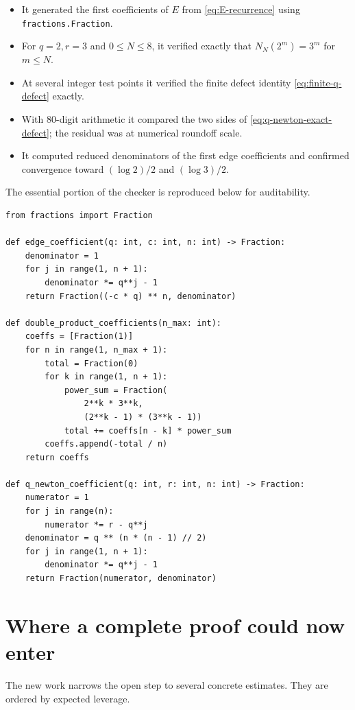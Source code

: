 \documentclass[11pt]{article}
\theoremstyle{definition}
\begin{document}
\begin{itemize}
\item It generated the first coefficients of \(E\) from \eqref{eq:E-recurrence} using \texttt{fractions.Fraction}.
\item For \(q=2,r=3\) and \(0\le N\le8\), it verified exactly that \(N_N(2^m)=3^m\) for \(m\le N\).
\item At several integer test points it verified the finite defect identity \eqref{eq:finite-q-defect} exactly.
\item With 80-digit arithmetic it compared the two sides of \eqref{eq:q-newton-exact-defect}; the residual was at numerical roundoff scale.
\item It computed reduced denominators of the first edge coefficients and confirmed convergence toward \((\log2)/2\) and \((\log3)/2\).
\end{itemize}

The essential portion of the checker is reproduced below for auditability.

\begin{lstlisting}[style=pycode]
from fractions import Fraction

def edge_coefficient(q: int, c: int, n: int) -> Fraction:
    denominator = 1
    for j in range(1, n + 1):
        denominator *= q**j - 1
    return Fraction((-c * q) ** n, denominator)

def double_product_coefficients(n_max: int):
    coeffs = [Fraction(1)]
    for n in range(1, n_max + 1):
        total = Fraction(0)
        for k in range(1, n + 1):
            power_sum = Fraction(
                2**k * 3**k,
                (2**k - 1) * (3**k - 1))
            total += coeffs[n - k] * power_sum
        coeffs.append(-total / n)
    return coeffs

def q_newton_coefficient(q: int, r: int, n: int) -> Fraction:
    numerator = 1
    for j in range(n):
        numerator *= r - q**j
    denominator = q ** (n * (n - 1) // 2)
    for j in range(1, n + 1):
        denominator *= q**j - 1
    return Fraction(numerator, denominator)
\end{lstlisting}

\section{Where a complete proof could now enter}

The new work narrows the open step to several concrete estimates.  They are ordered by expected leverage.
\end{document}
